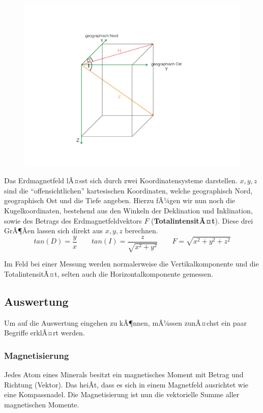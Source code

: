 \begin{figure}[H]
	\centering
	\includegraphics[scale = 0.4]{MagnetikBilder/geomagnetischeFeldelemente}
\end{figure}


Das Erdmagnetfeld lÃ¤sst sich durch zwei Koordinatensysteme darstellen. $x,y, z$ sind die "`offensichtlichen"' kartesischen Koordinaten, welche geographisch Nord, geographisch Ost und die Tiefe angeben. Hierzu fÃ¼gen wir nun noch die Kugelkoordinaten, bestehend aus den Winkeln der Deklination und Inklination, sowie des Betrags des Erdmagnetfeldvektors $F$ (\textbf{TotalintensitÃ¤t}). Diese drei GrÃ¶Ãen lassen sich direkt aus $x,y, z$ berechnen. \begin{equation*}
	tan (D) = \frac{y}{x} \quad \quad tan (I) = \frac{z}{\sqrt{x^2 + y^2}} \quad \quad F = \sqrt{x^2 + y^2 + z^2}
\end{equation*}

Im Feld bei einer Messung werden normalerweise die Vertikalkomponente und die TotalintensitÃ¤t, selten auch die Horizontalkomponente gemessen.


\subsection{Auswertung}
Um auf die Auswertung eingehen zu kÃ¶nnen, mÃ¼ssen zunÃ¤chst ein paar Begriffe erklÃ¤rt werden. 

\subsubsection{Magnetisierung}
Jedes Atom eines Minerals besitzt ein magnetisches Moment mit Betrag und Richtung (Vektor). Das heiÃt, dass es sich in einem Magnetfeld ausrichtet wie eine Kompassnadel. Die Magnetisierung ist nun die vektorielle Summe aller magnetischen Momente.

